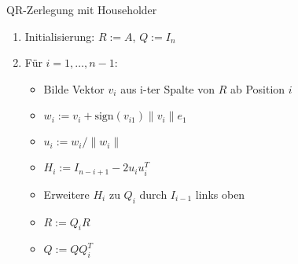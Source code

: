 \begin{KR}{QR-Zerlegung mit Householder}
\begin{enumerate}
    \item Initialisierung: $R := A$, $Q := I_n$
    \item Für $i = 1,\ldots,n-1$:
        \begin{itemize}
            \item Bilde Vektor $v_i$ aus i-ter Spalte von $R$ ab Position $i$
            \item $w_i := v_i + \text{sign}(v_{i1})\|v_i\|e_1$
            \item $u_i := w_i/\|w_i\|$
            \item $H_i := I_{n-i+1} - 2u_iu_i^T$
            \item Erweitere $H_i$ zu $Q_i$ durch $I_{i-1}$ links oben
            \item $R := Q_iR$
            \item $Q := QQ_i^T$
        \end{itemize}
\end{enumerate}
\end{KR}


